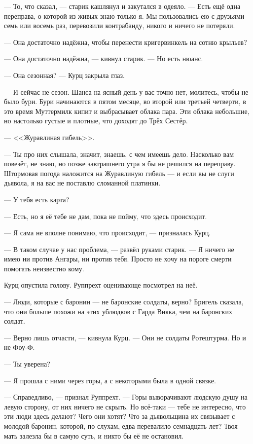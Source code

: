 --- То, что сказал, --- старик кашлянул и закутался в одеяло.
--- Есть ещё одна переправа, о которой из живых знаю только я.
Мы пользовались ею с друзьями семь или восемь раз, перевозили контрабанду, никого и ничего не потеряли.

--- Она достаточно надёжна, чтобы перенести кригервинкель на сотню крыльев?

--- Она достаточно надёжна, --- кивнул старик.
--- Но есть нюанс.

--- Она сезонная? --- Курц закрыла глаз.

--- И сейчас не сезон.
Шанса на ясный день у вас точно нет, молитесь, чтобы не было бури.
Бури начинаются в пятом месяце, во второй или третьей четверти, в это время Муттермилк кипит и выбрасывает облака пара.
Эти облака небольшие, но настолько густые и плотные, что доходят до Трёх Сестёр.

--- <<Журавлиная гибель>>.

--- Ты про них слышала, значит, знаешь, с чем имеешь дело.
Насколько вам повезёт, не знаю, но позже завтрашнего утра я бы не решился на переправу.
Штормовая погода наложится на Журавлиную гибель --- и если вы не слуги дьявола, я на вас не поставлю сломанной платинки.

--- У тебя есть карта?

--- Есть, но я её тебе не дам, пока не пойму, что здесь происходит.

--- Я сама не вполне понимаю, что происходит, --- призналась Курц.

--- В таком случае у нас проблема, --- развёл руками старик.
--- Я ничего не имею ни против Ангары, ни против тебя.
Просто не хочу на пороге смерти помогать неизвестно кому.

Курц опустила голову.
Руппрехт оценивающе посмотрел на неё.

--- Люди, которые с баронин --- не баронские солдаты, верно?
Бригель сказала, что они больше похожи на этих ублюдков с Гарда Викка, чем на баронских солдат.

--- Верно лишь отчасти, --- кивнула Курц.
--- Они не солдаты Ротештурма.
Но и не Фоу-Ф.

--- Ты уверена?

--- Я прошла с ними через горы, а с некоторыми была в одной связке.

--- Справедливо, --- признал Руппрехт.
--- Горы выворачивают людскую душу на левую сторону, от них ничего не скрыть.
Но всё-таки --- тебе не интересно, что эти люди здесь делают?
Чего они хотят?
Что за дьявольщина их связывает с молодой баронин, которой, по слухам, едва перевалило семнадцать лет?
Твоя мать залезла бы в самую суть, и никто бы её не остановил.

